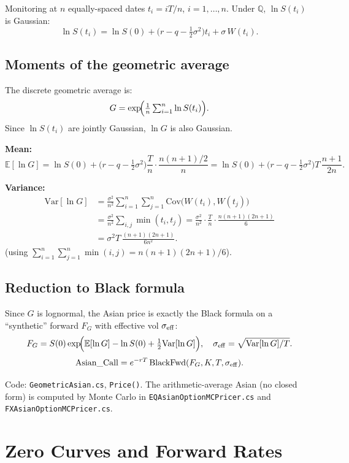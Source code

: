 \documentclass[11pt,a4paper]{article}
\newcommand{\E}{\mathbb{E}}
\newcommand{\Q}{\mathbb{Q}}
\newcommand{\coderef}[1]{\texttt{\color{blue!60!black}#1}}
\theoremstyle{definition}
\begin{document}
Monitoring at $n$ equally-spaced dates $t_i=iT/n$, $i=1,\ldots,n$.
Under $\Q$, $\ln S(t_i)$ is Gaussian:
\[
  \ln S(t_i) = \ln S(0) + \bigl(r-q-\tfrac{1}{2}\sigma^2\bigr)t_i
               + \sigma\,W(t_i).
\]

\subsection{Moments of the geometric average}

The discrete geometric average is:
\[
  G = \exp\!\Bigl(\tfrac{1}{n}\textstyle\sum_{i=1}^n \ln S(t_i)\Bigr).
\]
Since $\ln S(t_i)$ are jointly Gaussian, $\ln G$ is also Gaussian.

\textbf{Mean:}
\[
  \E[\ln G] = \ln S(0) + \bigl(r-q-\tfrac{1}{2}\sigma^2\bigr)\frac{T}{n}
              \cdot\frac{n(n+1)/2}{n}
  = \ln S(0) + \bigl(r-q-\tfrac{1}{2}\sigma^2\bigr)T\,\frac{n+1}{2n}.
\]

\textbf{Variance:}
\begin{align*}
  \mathrm{Var}[\ln G]
  &= \frac{\sigma^2}{n^2}\sum_{i=1}^n\sum_{j=1}^n \mathrm{Cov}\bigl(W(t_i),W(t_j)\bigr)\\
  &= \frac{\sigma^2}{n^2}\sum_{i,j}\min(t_i,t_j)
   = \frac{\sigma^2}{n^2}\cdot\frac{T}{n}\cdot\frac{n(n+1)(2n+1)}{6}\\
  &= \sigma^2 T\,\frac{(n+1)(2n+1)}{6n^2}.
\end{align*}
(using $\sum_{i=1}^n\sum_{j=1}^n\min(i,j)=n(n+1)(2n+1)/6$).

\subsection{Reduction to Black formula}

Since $G$ is lognormal, the Asian price is exactly the Black formula on a
``synthetic'' forward $F_G$ with effective vol $\sigma_{\rm eff}$:
\[
  F_G = S(0)\exp\!\Bigl(\E[\ln G]-\ln S(0)+\tfrac{1}{2}\mathrm{Var}[\ln G]\Bigr),
  \quad \sigma_{\rm eff}=\sqrt{\mathrm{Var}[\ln G]/T}.
\]
\[
  \mathrm{Asian\_Call} = e^{-rT}\,\mathrm{BlackFwd}(F_G,K,T,\sigma_{\rm eff}).
\]

Code: \coderef{GeometricAsian.cs}, \texttt{Price()}.  The arithmetic-average
Asian (no closed form) is computed by Monte Carlo in
\coderef{EQAsianOptionMCPricer.cs} and \coderef{FXAsianOptionMCPricer.cs}.

\section{Zero Curves and Forward Rates}
\label{sec:curves}
\end{document}
